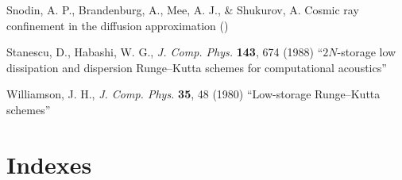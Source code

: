 \documentclass[\mydriver,12pt,twoside,notitlepage,a4paper]{article}
\begin{document}
\begin{thebibliography}{99}
Snodin, A. P., Brandenburg, A., Mee, A. J., \& Shukurov, A.
{Cosmic ray confinement in the diffusion approximation}
()

 Stanescu, D., Habashi, W. G.,
  \emph{J. Comp. Phys.} \textbf{143}, 674 (1988)
  ``$2N$-storage low dissipation and dispersion Runge--Kutta
  schemes for computational acoustics''

 Williamson, J. H.,
  \emph{J. Comp. Phys.} \textbf{35}, 48 (1980)
  ``Low-storage Runge--Kutta schemes''

\end{thebibliography}


\cleardoublepage

\part{Indexes}
\printindex[file]
\printindex[var]

\ \vfill\bigskip{}
\end{document}
